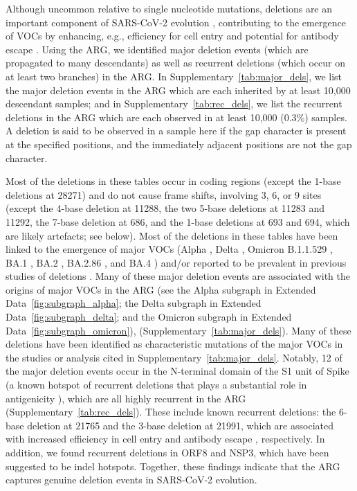 \documentclass[12pt]{article}
\newcommand{\edref}[1]{Extended Data~\ref{#1}}
\newcommand{\siref}[1]{Supplementary~\ref{#1}}
\begin{document}
Although uncommon relative to single nucleotide mutations,
deletions are an important component of
SARS-CoV-2 evolution \cite{Jeronimo2023},
contributing to the emergence of VOCs by enhancing,
e.g., efficiency for cell entry \cite{Cantoni2022} and
potential for antibody escape \cite{McCarthy2021}.
Using the ARG, we identified major deletion events
(which are propagated to many descendants)
as well as recurrent deletions
(which occur on at least two branches) in the ARG.
In \siref{tab:major_dels},
we list the major deletion events in the ARG
which are each inherited by at least 10,000 descendant samples; and
in \siref{tab:rec_dels},
we list the recurrent deletions in the ARG
which are each observed in at least 10,000 (0.3\%) samples.
A deletion is said to be observed in a sample here
if the gap character is present at the specified positions,
and the immediately adjacent positions are not the gap
character.

Most of the deletions in these tables occur in coding regions
(except the 1-base deletions at 28271) and
do not cause frame shifts, involving 3, 6, or 9 sites
(except
the 4-base deletion at 11288,
the two 5-base deletions at 11283 and 11292,
the 7-base deletion at 686, and
the 1-base deletions at 693 and 694,
which are likely artefacts; see below).
Most of the deletions in these tables
have been linked to the emergence of major VOCs
(Alpha \cite{RambautAlpha2020},
Delta \cite{Stern2021},
Omicron B.1.1.529 \cite{RambautOmicron2021},
BA.1 \cite{RambautOmicron2021},
BA.2 \cite{RambautOmicron2021},
BA.2.86 \cite{Planas2024}, and
BA.4 \cite{Tegally2022})
and/or reported to be prevalent
in previous studies of deletions \cite{Li2023indels}.
Many of these major deletion events
are associated with the origins of major VOCs in the ARG
(see the Alpha subgraph in \edref{fig:subgraph_alpha};
the Delta subgraph in \edref{fig:subgraph_delta}; and
the Omicron subgraph in \edref{fig:subgraph_omicron}),
(\siref{tab:major_dels}).
Many of these deletions have been identified
as characteristic mutations of the major VOCs
in the studies or analysis cited in \siref{tab:major_dels}.
Notably, 12 of the major deletion events occur
in the N-terminal domain of the S1 unit of Spike
(a known hotspot of recurrent deletions \cite{McCarthy2021}
that plays a substantial role in antigenicity \cite{Harvey2021}),
which are all highly recurrent in the ARG
(\siref{tab:rec_dels}).
These include known recurrent deletions:
the 6-base deletion at 21765 and
the 3-base deletion at 21991,
which are associated with
increased efficiency in cell entry \cite{Meng2021} and
antibody escape \cite{McCarthy2021}, respectively.
In addition, we found recurrent deletions in ORF8 and NSP3,
which have been suggested to be indel hotspots\cite{Akaishi2022}.
Together, these findings indicate that
the ARG captures genuine deletion events in SARS-CoV-2 evolution.
\end{document}
